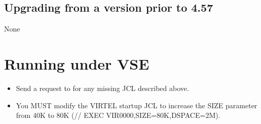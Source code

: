 \documentclass[letterpaper,10pt,english]{sphinxmanual}
\begin{document}
\section{Upgrading from a version prior to 4.57}
\label{\detokenize{Migration_Guide:upgrading-from-a-version-prior-to-4-57}}\label{\detokenize{Migration_Guide:index-7}}
None

\newpage


\chapter{Running under VSE}
\label{\detokenize{Migration_Guide:running-under-vse}}\label{\detokenize{Migration_Guide:index-8}}\begin{itemize}
\item {} 
Send a request to  for any missing JCL described above.

\item {} 
You MUST modify the VIRTEL startup JCL to increase the SIZE parameter from 40K to 80K (// EXEC VIR0000,SIZE=80K,DSPACE=2M).

\end{itemize}

\newpage

\end{document}
